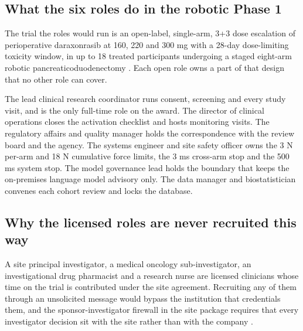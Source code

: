 \subsection{What the six roles do in the robotic Phase 1}

The trial the roles would run is an open-label, single-arm, 3+3 dose escalation
of perioperative daraxonrasib at 160, 220 and 300 mg with a 28-day
dose-limiting toxicity window, in up to 18 treated participants undergoing a
staged eight-arm robotic pancreaticoduodenectomy \cite{onpremwhippl,phase1ind}.
Each open role owns a part of that design that no other role can cover.

The lead clinical research coordinator runs consent, screening and every study
visit, and is the only full-time role on the award. The director of clinical
operations closes the activation checklist and hosts monitoring visits. The
regulatory affairs and quality manager holds the correspondence with the review
board and the agency. The systems engineer and site safety officer owns the 3 N
per-arm and 18 N cumulative force limits, the 3 ms cross-arm stop and the 500 ms
system stop. The model governance lead holds the boundary that keeps the
on-premises language model advisory only. The data manager and biostatistician
convenes each cohort review and locks the database.

\subsection{Why the licensed roles are never recruited this way}

A site principal investigator, a medical oncology sub-investigator, an
investigational drug pharmacist and a research nurse are licensed clinicians
whose time on the trial is contributed under the site agreement. Recruiting any
of them through an unsolicited message would bypass the institution that
credentials them, and the sponsor-investigator firewall in the site package
requires that every investigator decision sit with the site rather than with the
company \cite{movein2026}.
